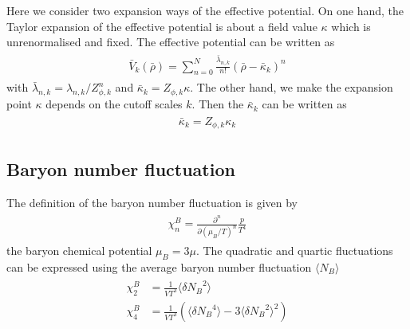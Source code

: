 \documentclass[%
reprint,
superscriptaddress,
showpacs,preprintnumbers,
 amsmath,amssymb,
 aps,
prd,
]{revtex4-1}
\begin{document}
Here we consider two expansion ways of the effective potential. On one hand, the Taylor expansion of the effective 
potential is about a field value $\kappa$ which is unrenormalised and fixed. The effective potential can be written as
\begin{align}\label{}
\begin{split}
\bar{V}_k(\bar{\rho})=\sum^{N}_{n=0}\frac{\bar{\lambda}_{n,k}}{n!}(\bar{\rho}-\bar{\kappa}_k)^n
\end{split}
\end{align}
with $\bar{\lambda}_{n,k}=\lambda_{n,k}/Z^{n}_{\phi,k}$ and $\bar{\kappa}_k=Z_{\phi,k}\kappa$.
The other hand, we make the expansion point $\kappa$ depends on the cutoff scales $k$. Then the $\bar{\kappa}_k$ 
can be written as
\begin{align}\label{}
\begin{split}
\bar{\kappa}_k=Z_{\phi,k}\kappa_k
\end{split}
\end{align} 



\subsection{Baryon number fluctuation}
The definition of the baryon number fluctuation is given by
\begin{align}\label{}
\begin{split}
\chi^{B}_{n}=\frac{\partial^n}{\partial(\mu_B/T)^n}\frac{p}{T^4}
\end{split}
\end{align} 
the baryon chemical potential $\mu_B=3\mu$. The quadratic and quartic fluctuations can be expressed using the 
average baryon number fluctuation $\langle N_B \rangle$
\begin{align}\label{}
\begin{split}
\chi^{B}_{2}&=\frac{1}{VT^3}\langle \delta {N_B}^2 \rangle\\
\chi^{B}_{4}&=\frac{1}{VT^3}\left( \langle \delta {N_B}^4 \rangle-3\langle \delta {N_B}^2 \rangle^2 \right)
\end{split}
\end{align} 





\appendix
\end{document}
